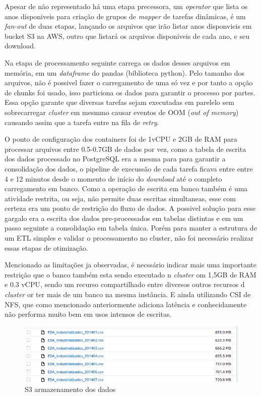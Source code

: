 Apesar de não representado há uma etapa precessora, um \emph{operator} que lista os anos disponiveis para criação de grupos de \emph{mapper} de tarefas dinâmicas, é um \emph{fan-out} de duas etapas, lançando os arquivos que irão listar anos disponvieis em bucket S3 na AWS, outro que listará os arquivos disponiveis de cada ano, e seu download.

Na etapa de processamento seguinte carrega os dados desses arquivos em memória, em um \emph{dataframe} do {pandas} (biblioteca python). Pelo tamanho dos arquivos, não é possivel fazer o carregamento de uma só vez e por tanto a opção de chunks foi usado, isso particiona os dados para garantir o processo por partes. Essa opção garante que diversas tarefas sejam executadas em parelelo sem sobrecarregar  \emph{cluster} em mesmmo causar eventos de OOM (\emph{out of memory}) causando assim que a tarefa entre na fila de \emph{retry}.

O ponto de configuração dos containers foi de 1vCPU e 2GB de RAM para processar arquivos entre 0.5-0.7GB de dados por vez, como a tabela de escrita dos dados processado no PostgreSQL era a mesma para para garantir a consolidação dos dados, o pipeline de execussão de cada tarefa ficava entre entre 4 e 12 minutos desde o momento de início do \emph{download} até o completo carregamento em banco. Como a operação de escrita em banco também é uma atividade restrita, ou seja, não permite duas escritas simultaneas, esse com certeza era um ponto de restrição do fluxo de dados. A possivel solução para esse gargalo era a escrita dos dados pre-processados em tabelas distintas e em um passo seguinte a consolidação em tabela única. Porém para manter a estrutura de um ETL simples e validar o processamento no cluster, não foi necessário realizar essas etapas de otimização. 

Mencionado as limitações ja observadas, é necssário indicar mais uma importante restrição que o banco também esta sendo executado n \emph{cluster} om 1,5GB de RAM e 0.3 vCPU, sendo um recurso compartilhado entre diversos outros recursos d \emph{cluster} or ter mais de um banco na mesma instância. E ainda utilizando CSI de NFS, que como mencionado anteriormente adiciona latência e conhecidamente não performa muito bem em usos intensos de escritas.

\begin{figure}[!ht]
    \centering
    \includegraphics[width=0.8\linewidth]{04-figuras/s3_size.png}
    \caption{S3 armazenamento dos dados}
    \label{fig:s3_storage}
\end{figure}


